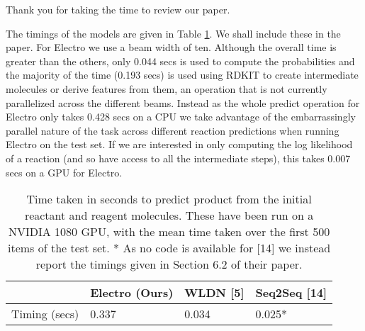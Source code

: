 \documentclass{article}
\begin{document}
Thank you for taking the time to review our paper.




The timings of the models are given in Table \ref{table:timings}. We shall include these in the paper.
 For Electro we use a beam width of ten. 
 Although the overall time is greater than the others, only 0.044 secs is used to compute the probabilities and the majority of the time (0.193 secs) is used using RDKIT to create intermediate molecules or derive features from them, an operation that is not currently parallelized across the different beams. 
 Instead as the whole predict operation for Electro only takes 0.428 secs on a CPU we take advantage of the embarrassingly parallel nature of the task across different reaction predictions when running Electro on the test set.
 If we are interested in only computing the log likelihood of a reaction (and so have access to all the intermediate steps), this takes 0.007 secs on a GPU for Electro.
 
 
 

\begin{table}[h]
  \caption{Time taken in seconds to predict product from the initial reactant and reagent molecules.
  These have been run on a NVIDIA 1080 GPU, with the mean time taken over the first 500 items of the test set.
  * As no code is available for [14] we instead report the timings given in Section 6.2 of their paper.
  }
  \label{table:timings}
  \centering
  \begin{tabular}{llll}
    \toprule
    & Electro (Ours) & WLDN [5] & Seq2Seq [14]  \\
    \midrule
    Timing (secs) & 0.337   & 0.034 &  0.025*     \\
    \bottomrule
  \end{tabular}
\end{table}
\end{document}
